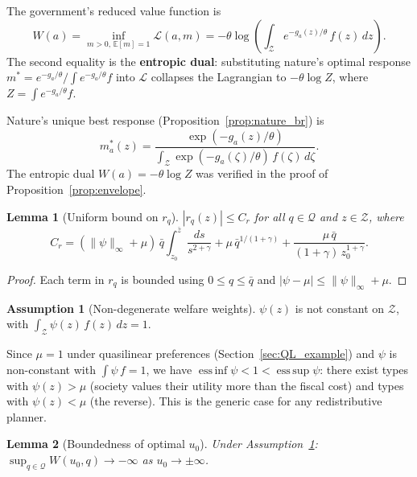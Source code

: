 \documentclass[12pt,a4paper]{article}
\theoremstyle{definition}
\newtheorem{assumption}{Assumption}[section]
\theoremstyle{plain}
\newtheorem{lemma}{Lemma}[section]
\theoremstyle{remark}
\newcommand{\E}{\mathbb{E}}
\newcommand{\zbar}{\bar{z}}
\newcommand{\zlow}{z_{\scriptscriptstyle 0}}
\newcommand{\calZ}{\mathcal{Z}}
\newcommand{\calL}{\mathcal{L}}
\begin{document}
The government's reduced value function is
\begin{equation}
\label{eq:W_def}
  W(a) = \inf_{m > 0,\,\E[m]=1} \calL(a, m)
  = -\theta\log\!\left(
    \int_\calZ e^{-g_a(z)/\theta}\,f(z)\,dz
  \right).
\end{equation}
The second equality is the \textbf{entropic dual}:
substituting nature's optimal response
$m^* = e^{-g_a/\theta}/\!\int e^{-g_a/\theta}f$
into $\calL$ collapses the Lagrangian to $-\theta\log Z$,
where $Z = \int e^{-g_a/\theta}f$.

Nature's unique best response
(Proposition~\ref{prop:nature_br}) is
\begin{equation}
\label{eq:m_star_explicit}
  m_a^*(z) = \frac{\exp(-g_a(z)/\theta)}
  {\int_\calZ \exp(-g_a(\zeta)/\theta)\,f(\zeta)\,d\zeta}.
\end{equation}
The entropic dual $W(a) = -\theta\log Z$ was verified in the proof of Proposition~\ref{prop:envelope}.

\begin{lemma}[Uniform bound on $r_q$]
\label{lem:Cr_bound}
$|r_q(z)| \leq C_r$ for all $q \in \mathcal{Q}$ and
$z \in \calZ$, where
\begin{equation}
\label{eq:Cr}
  C_r = (\|\psi\|_\infty + \mu)\,\bar q
  \int_{\zlow}^{\zbar}\frac{ds}{s^{2+\gamma}}
  + \mu\,\bar q^{1/(1+\gamma)}
  + \frac{\mu\,\bar q}{(1+\gamma)\,\zlow^{1+\gamma}}.
\end{equation}
\end{lemma}

\begin{proof}
Each term in $r_q$ is bounded using
$0 \leq q \leq \bar q$ and
$|\psi - \mu| \leq \|\psi\|_\infty + \mu$.
\end{proof}

\begin{assumption}[Non-degenerate welfare weights]
\label{as:mu_interior}
$\psi(z)$ is not constant on $\calZ$, with $\int_{\calZ} \psi(z)\,f(z)\,dz = 1$.
\end{assumption}

Since $\mu = 1$ under quasilinear preferences (Section~\ref{sec:QL_example}) and $\psi$ is non-constant with $\int \psi\,f = 1$, we have $\operatorname*{ess\,inf}\psi < 1 < \operatorname*{ess\,sup}\psi$: there exist types with $\psi(z) > \mu$ (society values their utility more than the fiscal cost) and types with $\psi(z) < \mu$ (the reverse). This is the generic case for any redistributive planner.

\begin{lemma}[Boundedness of optimal $u_0$]
\label{lem:coercivity}
Under Assumption~\ref{as:mu_interior}:
$\sup_{q \in \mathcal{Q}} W(u_0, q) \to -\infty$
as $u_0 \to \pm\infty$.
\end{lemma}
\end{document}
